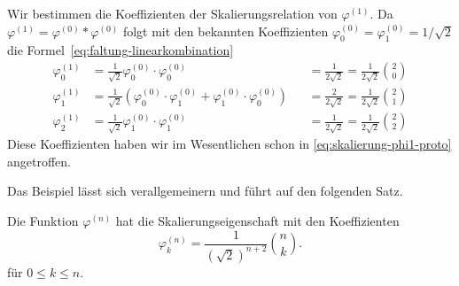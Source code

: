 \begin{beispiel}
Wir bestimmen die Koeffizienten der Skalierungsrelation von $\varphi^{(1)}$.
Da $\varphi^{(1)}=\varphi^{(0)}*\varphi^{(0)}$ folgt mit den bekannten
Koeffizienten $\varphi^{(0)}_0=\varphi^{(0)}_1=1/\sqrt{2}$ die
Formel~\eqref{eq:faltung-linearkombination}
\[
\begin{aligned}
\varphi^{(1)}_0
&=
\frac1{\sqrt{2}}
\varphi^{(0)}_0
\cdot
\varphi^{(0)}_0
&&=
\frac{1}{2\sqrt{2}}
=\frac{1}{2\sqrt{2}}\binom{2}{0}
\\
\varphi^{(1)}_1
&=
\frac1{\sqrt{2}}
(
\varphi^{(0)}_0
\cdot
\varphi^{(0)}_1
+
\varphi^{(0)}_1
\cdot
\varphi^{(0)}_0
)
&&=
\frac{2}{2\sqrt{2}}
=\frac{1}{2\sqrt{2}}\binom{2}{1}
\\
\varphi^{(1)}_2
&=
\frac1{\sqrt{2}}
\varphi^{(0)}_1
\cdot
\varphi^{(0)}_1
&&=
\frac{1}{2\sqrt{2}}
=\frac{1}{2\sqrt{2}}\binom{2}{2}
\end{aligned}
\]
Diese Koeffizienten haben wir im Wesentlichen schon in
\eqref{eq:skalierung-phi1-proto} angetroffen.
\end{beispiel}

Das Beispiel lässt sich verallgemeinern und führt auf den folgenden Satz.

\begin{satz}
Die Funktion $\varphi^{(n)}$ hat die Skalierungseigenschaft  mit den
Koeffizienten
\[
\varphi^{(n)}_k = \frac{1}{(\sqrt{2})^{n+2}}\binom{n}{k}.
\]
für $0\le k\le n$.
\end{satz}




